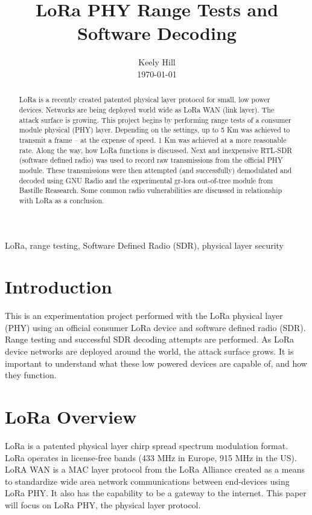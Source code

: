\documentclass[conference, compsoc]{IEEEtran}
\title{\huge{LoRa PHY Range Tests and Software Decoding}}
\author{Keely Hill\\\today}
\begin{document}
\maketitle

\begin{abstract}
LoRa is a recently created patented physical layer protocol for small, low power devices. Networks are being deployed world wide as LoRa WAN (link layer). The attack surface is growing. This project begins by performing range tests of a consumer module physical (PHY) layer. Depending on the settings, up to 5 Km was achieved to transmit a frame -- at the expense of speed. 1 Km was achieved at a more reasonable rate. Along the way, how LoRa functions is discussed. Next and inexpensive RTL-SDR (software defined radio) was used to record raw transmissions from the official PHY module. These transmissions were then attempted (and successfully) demodulated and decoded using GNU Radio and the experimental gr-lora out-of-tree module from Bastille Reasearch. Some common radio vulnerabilities are discussed in relationship with LoRa as a conclusion.
\end{abstract}

\renewcommand\IEEEkeywordsname{Keywords}
\begin{IEEEkeywords}
LoRa, range testing, Software Defined Radio (SDR), physical layer security
\end{IEEEkeywords}


\section{Introduction}
This is an experimentation project performed with the LoRa physical layer (PHY) using an official consumer LoRa device and software defined radio (SDR). Range testing and successful SDR decoding attempts are performed. As LoRa device networks are deployed around the world, the attack surface grows. It is important to understand what these low powered devices are capable of, and how they function.

\section{LoRa Overview}
LoRa is a patented physical layer chirp spread spectrum modulation format. LoRa operates in license-free bands (433 MHz in Europe, 915 MHz in the US). LoRA WAN is a MAC layer protocol from the LoRa Alliance created as a means to standardize wide area network communications between end-devices\cite{lora-all} using LoRa PHY. It also has the capability to be a gateway to the internet. This paper will focus on LoRa PHY, the physical layer protocol. 
\end{document}
